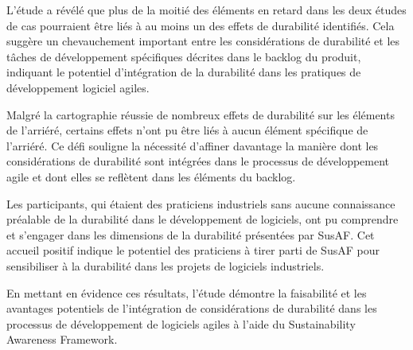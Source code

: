 L'étude a révélé que plus de la moitié des éléments en retard dans les deux études de cas pourraient être liés à au moins un des effets de durabilité identifiés. Cela suggère un chevauchement important entre les considérations de durabilité et les tâches de développement spécifiques décrites dans le backlog du produit, indiquant le potentiel d'intégration de la durabilité dans les pratiques de développement logiciel agiles.

Malgré la cartographie réussie de nombreux effets de durabilité sur les éléments de l’arriéré, certains effets n’ont pu être liés à aucun élément spécifique de l’arriéré. Ce défi souligne la nécessité d’affiner davantage la manière dont les considérations de durabilité sont intégrées dans le processus de développement agile et dont elles se reflètent dans les éléments du backlog.

Les participants, qui étaient des praticiens industriels sans aucune connaissance préalable de la durabilité dans le développement de logiciels, ont pu comprendre et s'engager dans les dimensions de la durabilité présentées par SusAF. Cet accueil positif indique le potentiel des praticiens à tirer parti de SusAF pour sensibiliser à la durabilité dans les projets de logiciels industriels.

En mettant en évidence ces résultats, l'étude démontre la faisabilité et les avantages potentiels de l'intégration de considérations de durabilité dans les processus de développement de logiciels agiles à l'aide du Sustainability Awareness Framework.
